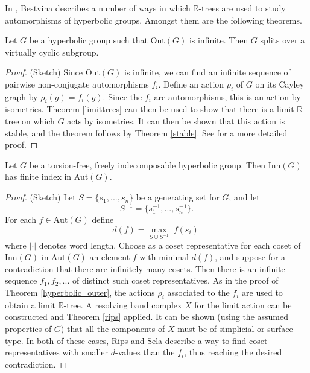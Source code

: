 \subsubsection{} 
In \cite{Bestvina_trees}, Bestvina describes a number of ways in which $\mathbb{R}$-trees are used to study automorphisms of hyperbolic groups. Amongst them are the following theorems.
\begin{theorem}\label{hyperbolic_outer}
    Let $G$ be a hyperbolic group such that Out$(G)$ is infinite. Then $G$ splits over a virtually cyclic subgroup.
\end{theorem}

\begin{proof} (Sketch)
    Since Out$(G)$ is infinite, we can find an infinite sequence of pairwise non-conjugate automorphisms $f_i$. Define an action $\rho_i$ of $G$ on its Cayley graph by $\rho_i(g)=f_i(g)$. %
    Since the $f_i$ are automorphisms, this is an action by isometries. Theorem \ref{limittrees} can then be used to show that there is a limit $\mathbb{R}$-tree on which $G$ acts by isometries. It can then be shown that this action is stable, and the theorem follows by Theorem \ref{stable}. See \cite{Bestvina_trees} for a more detailed proof.
\end{proof}

\begin{theorem}
    Let $G$ be a torsion-free, freely indecomposable hyperbolic group. Then Inn$(G)$ has finite index in Aut$(G)$.
\end{theorem}
\begin{proof}
    (Sketch) Let $S=\{s_1,...,s_n\}$ be a generating set for $G$, and let \[S^{-1}=\{s_1^{-1},...,s_n^{-1}\}.\] For each $f\in \text{Aut}(G)$ define \[d(f)=\max_{S\cup S^{-1}}\lvert f(s_i)\rvert\] where $\lvert \cdot \rvert$ denotes word length. Choose as a coset representative for each coset of Inn$(G)$ in Aut$(G)$ an element $f$ with minimal $d(f)$, and suppose for a contradiction that there are infinitely many cosets. Then there is an infinite sequence $f_1,f_2,...$ of distinct such coset representatives. As in the proof of Theorem \ref{hyperbolic_outer}, the actions $\rho_i$ associated to the $f_i$ are used to obtain a limit $\mathbb{R}$-tree. A resolving band complex $X$ for the limit action can be constructed and Theorem \ref{rips} applied. It can be shown (using the assumed properties of $G$) that all the components of $X$ must be of simplicial or surface type. In both of these cases, Rips and Sela describe a way to find coset representatives with smaller $d$-values than the $f_i$, thus reaching the desired contradiction.
\end{proof}


